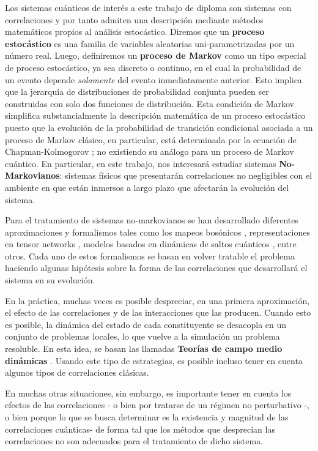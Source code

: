 \documentclass{report} %
\numberwithin{equation}{section}
\begin{document}
Los sistemas cuánticos de interés a este trabajo de diploma son sistemas con correlaciones y por tanto admiten una descripción mediante métodos matemáticos propios al análisis estocástico. Diremos que un \textbf{proceso estocástico} \cite{HeinzPetruccione} es una familia de variables aleatorias uni-parametrizadas 
por un número real. Luego, definiremos un \textbf{proceso de Markov} \cite{HeinzPetruccione} como un tipo especial de proceso estocástico, ya sea discreto o continuo, en el cual la probabilidad de un evento depende \textit{solamente} del evento inmediatamente anterior. Esto implica que la jerarquía de distribuciones de probabilidad conjunta pueden ser construidas con solo dos funciones de distribución. Esta condición de Markov simplifica substancialmente la descripción matemática de un proceso estocástico puesto que la evolución de la probabilidad de transición condicional asociada a un proceso de Markov clásico, en particular, está determinada por la ecuación de Chapman-Kolmogorov \cite{HeinzPetruccione, Dynkin89}; no existiendo su análogo para un proceso de Markov cuántico. En particular, en este trabajo, nos interesará estudiar sistemas \textbf{No-Markovianos}: sistemas físicos que presentarán correlaciones no negligibles con el ambiente en que están inmersos a largo plazo que afectarán la evolución del sistema. 

Para el tratamiento de sistemas no-markovianos se han desarrollado diferentes aproximaciones y formalismos tales como los mapeos bosónicos \cite{huber2020phase}, representaciones en tensor networks \cite{HOPS,TEDOPA,DAMPF}, modelos basados en dinámicas de saltos cuánticos \cite{Plenio1998,Pilo2008}, entre otros. Cada uno de estos formalismos se basan en volver tratable el problema haciendo algunas hipótesis sobre la forma de las correlaciones que desarrollará el sistema en su evolución. 

En la práctica, muchas veces es posible despreciar, en una primera aproximación, el efecto de las correlaciones y de las interacciones que las producen. Cuando esto es posible, la dinámica del estado de cada constituyente se desacopla en un conjunto de problemas locales, lo que vuelve a la simulación un problema resoluble. En esta idea, se basan las llamadas \textbf{Teorías de campo medio dinámicas} \cite{GKW1996}. Usando este tipo de estrategias, es posible incluso tener en cuenta algunos tipos de correlaciones clásicas\cite{CMR.07}. 

En muchas otras situaciones, sin embargo, es importante tener en cuenta los efectos de las correlaciones - o bien por tratarse de un régimen no perturbativo -, o bien porque lo que se busca determinar es la existencia y magnitud de las correlaciones cuánticas- de forma tal que los métodos que desprecian las correlaciones no son adecuados para el tratamiento de dicho sistema. 
\end{document}
